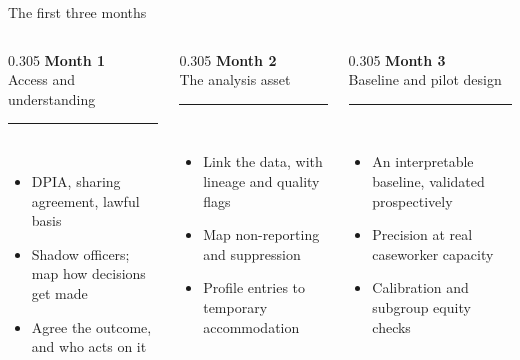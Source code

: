 \documentclass[aspectratio=169,11pt]{beamer}
\newcommand{\smallcap}[1]{{\footnotesize\color{inktwo}#1}}
\begin{document}
\begin{frame}{The first three months}
  \begin{columns}[T,onlytextwidth]

    \begin{column}{0.305\textwidth}
      {\color{seriesone}\bfseries\large Month 1}\\[0.3mm]
      \smallcap{Access and understanding}\\[1.2mm]
      {\color{seriesone}\rule{\textwidth}{1.1pt}}\\[0.5mm]
      \footnotesize
      \begin{itemize}\setlength\itemsep{3pt}
        \item DPIA, sharing agreement, lawful basis
        \item Shadow officers; map how decisions get made
        \item Agree the outcome, and who acts on it
      \end{itemize}
    \end{column}

    \begin{column}{0.305\textwidth}
      {\color{seriestwo}\bfseries\large Month 2}\\[0.3mm]
      \smallcap{The analysis asset}\\[1.2mm]
      {\color{seriestwo}\rule{\textwidth}{1.1pt}}\\[0.5mm]
      \footnotesize
      \begin{itemize}\setlength\itemsep{3pt}
        \item Link the data, with lineage and quality flags
        \item Map non-reporting and suppression
        \item Profile entries to temporary accommodation
      \end{itemize}
    \end{column}

    \begin{column}{0.305\textwidth}
      {\color{seriesthree}\bfseries\large Month 3}\\[0.3mm]
      \smallcap{Baseline and pilot design}\\[1.2mm]
      {\color{seriesthree}\rule{\textwidth}{1.1pt}}\\[0.5mm]
      \footnotesize
      \begin{itemize}\setlength\itemsep{3pt}
        \item An interpretable baseline, validated prospectively
        \item Precision at real caseworker capacity
        \item Calibration and subgroup equity checks
      \end{itemize}
    \end{column}


\end{columns}
\end{frame}
\end{document}
